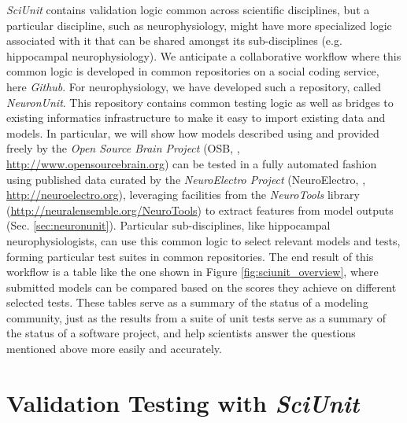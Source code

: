 \documentclass{frontiersSCNS}
\begin{document}
\textit{SciUnit} contains validation logic common across scientific disciplines, but a particular discipline, such as neurophysiology, might have more specialized logic associated with it that can be shared amongst its sub-disciplines (e.g. hippocampal neurophysiology). We anticipate a collaborative workflow where this common logic is developed in common repositories on a social coding service, here \textit{Github}. For neurophysiology, we have developed such a repository, called \textit{NeuronUnit}. This repository contains common testing logic as well as bridges to existing informatics infrastructure to make it easy to import existing data and models. In particular, we will show how models described using  and provided freely by the \textit{Open Source Brain Project} (OSB, \cite{gleeson_open_2012}, \url{http://www.opensourcebrain.org}) can be tested in a fully automated fashion using published data curated by the \textit{NeuroElectro Project} (NeuroElectro, \cite{tripathy_neuroelectro:_2012}, \url{http://neuroelectro.org}), leveraging facilities from the \textit{NeuroTools} library (\url{http://neuralensemble.org/NeuroTools}) to extract features from model outputs (Sec. \ref{sec:neuronunit}). Particular sub-disciplines, like hippocampal neurophysiologists, can use this common logic to select relevant models and tests, forming particular test suites in common repositories. The end result of this workflow is a table like the one shown in Figure \ref{fig:sciunit_overview}, where submitted models can be compared based on the scores they achieve on different selected tests. These tables serve as a summary of the status of a modeling community, just as the results from a suite of unit tests serve as a summary of the status of a software project, and help scientists answer the questions mentioned above more easily and accurately.

\section{Validation Testing with \textit{SciUnit}}\label{sec:sciunit}
\end{document}
